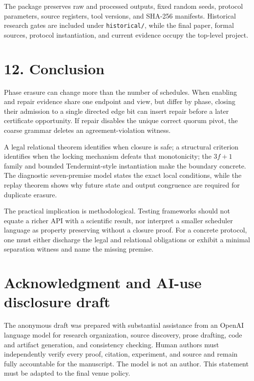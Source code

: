 \documentclass[10pt,a4paper]{article}
\begin{document}
The package preserves raw and processed outputs, fixed random seeds,
protocol parameters, source registers, tool versions, and SHA-256
manifests. Historical research gates are included under
\texttt{historical/}, while the final paper, formal sources, protocol
instantiation, and current evidence occupy the top-level project.

\section{12. Conclusion}\label{conclusion}

Phase erasure can change more than the number of schedules. When
enabling and repair evidence share one endpoint and view, but differ by
phase, closing their admission to a single directed edge bit can insert
repair before a later certificate opportunity. If repair disables the
unique correct quorum pivot, the coarse grammar deletes an
agreement-violation witness.

A legal relational theorem identifies when closure is safe; a structural
criterion identifies when the locking mechanism defeats that
monotonicity; the \(3f+1\) family and bounded Tendermint-style
instantiation make the boundary concrete. The diagnostic seven-premise
model states the exact local conditions, while the replay theorem shows
why future state and output congruence are required for duplicate
erasure.

The practical implication is methodological. Testing frameworks should
not equate a richer API with a scientific result, nor interpret a
smaller scheduler language as property preserving without a closure
proof. For a concrete protocol, one must either discharge the legal and
relational obligations or exhibit a minimal separation witness and name
the missing premise.

\section{Acknowledgment and AI-use disclosure
draft}\label{acknowledgment-and-ai-use-disclosure-draft}

The anonymous draft was prepared with substantial assistance from an
OpenAI language model for research organization, source discovery, prose
drafting, code and artifact generation, and consistency checking. Human
authors must independently verify every proof, citation, experiment, and
source and remain fully accountable for the manuscript. The model is not
an author. This statement must be adapted to the final venue policy.
\end{document}
